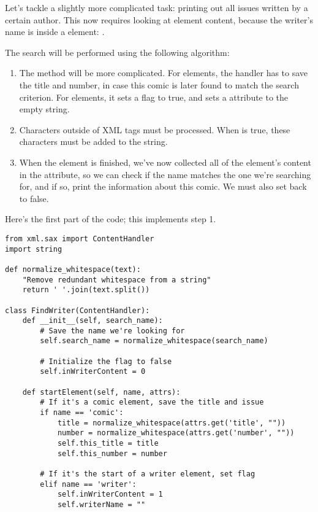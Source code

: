 \documentclass{howto}
\newcommand{\element}[1]{\code{#1}}
\begin{document}
Let's tackle a slightly more complicated task: printing out all issues
written by a certain author.  This now requires looking at element
content, because the writer's name is inside a \element{writer}
element: .

The search will be performed using the following algorithm:

\begin{enumerate}
\item 
The  method will be more complicated.  For
\element{comic} elements, the handler has to save the title and
number, in case this comic is later found to match the search
criterion.  For \element{writer} elements, it sets a
 flag to true, and sets a 
attribute to the empty string.

\item Characters outside of XML tags must be processed.  When
 is true, these characters must be added to the
 string.

\item When the \element{writer} element is finished, we've now
collected all of the element's content in the 
attribute, so we can check if the name matches the one we're searching 
for, and if so, print the information about this comic.  We must also
set  back to false.
\end{enumerate}

Here's the first part of the code; this implements step 1.

\begin{verbatim}
from xml.sax import ContentHandler
import string

def normalize_whitespace(text):
    "Remove redundant whitespace from a string"
    return ' '.join(text.split())

class FindWriter(ContentHandler):
    def __init__(self, search_name):
        # Save the name we're looking for
        self.search_name = normalize_whitespace(search_name)

        # Initialize the flag to false
        self.inWriterContent = 0

    def startElement(self, name, attrs):
        # If it's a comic element, save the title and issue
        if name == 'comic':
            title = normalize_whitespace(attrs.get('title', ""))
            number = normalize_whitespace(attrs.get('number', ""))
            self.this_title = title
            self.this_number = number

        # If it's the start of a writer element, set flag
        elif name == 'writer':
            self.inWriterContent = 1
            self.writerName = ""
\end{verbatim}
\end{document}
